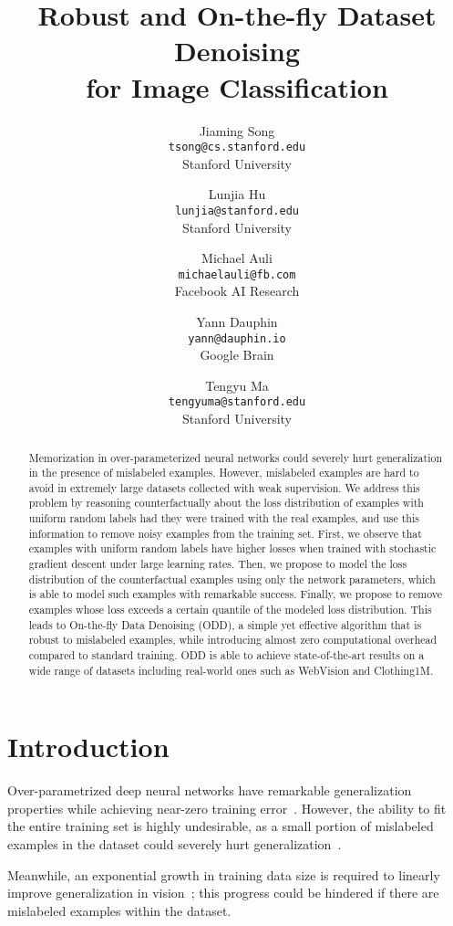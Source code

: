 \documentclass[a4paper,11pt]{article}
\title{\textbf{Robust and On-the-fly Dataset Denoising \\ for Image Classification}}
\author{Jiaming Song 
\\ \texttt{tsong@cs.stanford.edu}
\\ Stanford University\and
Lunjia Hu
\\ \texttt{lunjia@stanford.edu}
\\ Stanford University
\and 
Michael Auli \\ \texttt{michaelauli@fb.com}
\\ Facebook AI Research
\and
Yann Dauphin
\\ \texttt{yann@dauphin.io}
\\ Google Brain\and 
Tengyu Ma 
\\ \texttt{tengyuma@stanford.edu}
\\ Stanford University
}
\makeatletter
\def\blfootnote{\xdef\@thefnmark{}\@footnotetext}
\makeatother
\begin{document}
\maketitle


\begin{abstract}
Memorization in over-parameterized neural networks could severely hurt generalization in the presence of mislabeled examples. However, mislabeled examples are hard to avoid in extremely large datasets collected with weak supervision.
We address this problem by reasoning counterfactually about the loss distribution of examples with uniform random labels had they were trained with the real examples, and use this information to remove noisy examples from the training set.
First, we observe that examples with uniform random labels have higher losses when trained with stochastic gradient descent under large learning rates. 
Then, we propose to model the loss distribution of the counterfactual examples using only the network parameters, which is able to model such examples with remarkable success. Finally, we propose to remove examples whose loss exceeds a certain quantile of the modeled loss distribution.
This leads to {On-the-fly Data Denoising} (\textsc{ODD}), a simple yet effective algorithm that is robust to mislabeled examples, while introducing almost zero computational overhead compared to standard training.
\textsc{ODD} is able to achieve state-of-the-art results on a wide range of datasets including real-world ones such as WebVision and Clothing1M.
\end{abstract} 
\setlength{\tabcolsep}{1.4pt}

\section{Introduction}


\newcommand{\tnote}[1]{{\color{blue}Tengyu notes: #1}}

Over-parametrized deep neural networks have remarkable generalization properties while achieving near-zero training error~\cite{zhang2016understanding}. However, the ability to fit the entire training set is highly undesirable, as a small portion of mislabeled examples in the dataset could severely hurt generalization~\cite{zhang2016understanding,arpit2017a}.\blfootnote{Work done at Facebook AI research.}

Meanwhile, an exponential growth in training data size is required to linearly improve generalization in vision~\cite{sun2017revisiting}; this progress could be hindered if there are mislabeled examples within the dataset.
\end{document}
